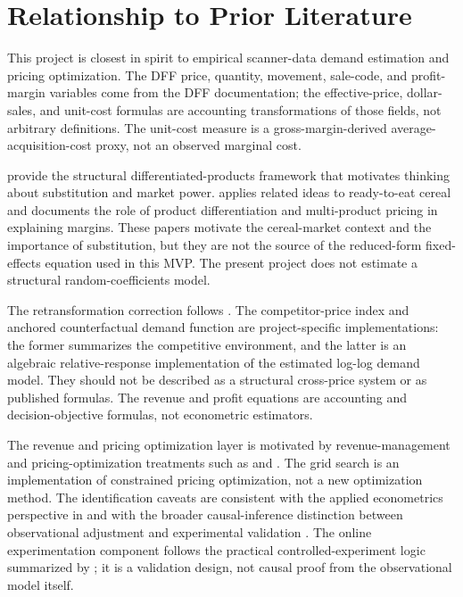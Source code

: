 \documentclass[11pt]{article}
\begin{document}
\section{Relationship to Prior Literature}

This project is closest in spirit to empirical scanner-data demand estimation and pricing optimization. The DFF price, quantity, movement, sale-code, and profit-margin variables come from the DFF documentation; the effective-price, dollar-sales, and unit-cost formulas are accounting transformations of those fields, not arbitrary definitions. The unit-cost measure is a gross-margin-derived average-acquisition-cost proxy, not an observed marginal cost.

\citet{berry1995} provide the structural differentiated-products framework that motivates thinking about substitution and market power. \citet{nevo2001} applies related ideas to ready-to-eat cereal and documents the role of product differentiation and multi-product pricing in explaining margins. These papers motivate the cereal-market context and the importance of substitution, but they are not the source of the reduced-form fixed-effects equation used in this MVP. The present project does not estimate a structural random-coefficients model.

The retransformation correction follows \citet{duan1983}. The competitor-price index and anchored counterfactual demand function are project-specific implementations: the former summarizes the competitive environment, and the latter is an algebraic relative-response implementation of the estimated log-log demand model. They should not be described as a structural cross-price system or as published formulas. The revenue and profit equations are accounting and decision-objective formulas, not econometric estimators.

The revenue and pricing optimization layer is motivated by revenue-management and pricing-optimization treatments such as \citet{talluri2004} and \citet{phillips2005}. The grid search is an implementation of constrained pricing optimization, not a new optimization method. The identification caveats are consistent with the applied econometrics perspective in \citet{angrist2009} and with the broader causal-inference distinction between observational adjustment and experimental validation \citep{imbens2015}. The online experimentation component follows the practical controlled-experiment logic summarized by \citet{kohavi2020}; it is a validation design, not causal proof from the observational model itself.
\end{document}
